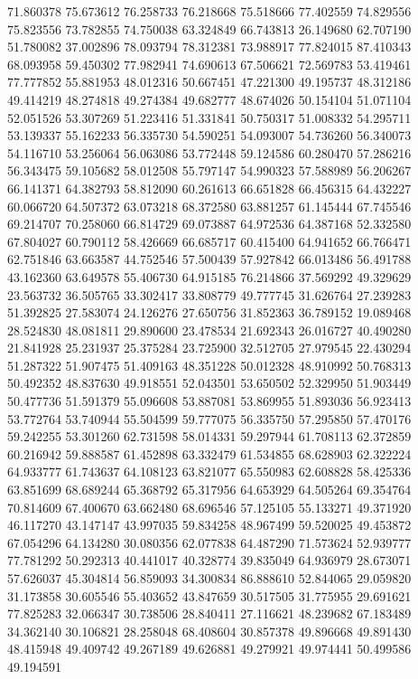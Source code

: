71.860378
75.673612
76.258733
76.218668
75.518666
77.402559
74.829556
75.823556
73.782855
74.750038
63.324849
66.743813
26.149680
62.707190
51.780082
37.002896
78.093794
78.312381
73.988917
77.824015
87.410343
68.093958
59.450302
77.982941
74.690613
67.506621
72.569783
53.419461
77.777852
55.881953
48.012316
50.667451
47.221300
49.195737
48.312186
49.414219
48.274818
49.274384
49.682777
48.674026
50.154104
51.071104
52.051526
53.307269
51.223416
51.331841
50.750317
51.008332
54.295711
53.139337
55.162233
56.335730
54.590251
54.093007
54.736260
56.340073
54.116710
53.256064
56.063086
53.772448
59.124586
60.280470
57.286216
56.343475
59.105682
58.012508
55.797147
54.990323
57.588989
56.206267
66.141371
64.382793
58.812090
60.261613
66.651828
66.456315
64.432227
60.066720
64.507372
63.073218
68.372580
63.881257
61.145444
67.745546
69.214707
70.258060
66.814729
69.073887
64.972536
64.387168
52.332580
67.804027
60.790112
58.426669
66.685717
60.415400
64.941652
66.766471
62.751846
63.663587
44.752546
57.500439
57.927842
66.013486
56.491788
43.162360
63.649578
55.406730
64.915185
76.214866
37.569292
49.329629
23.563732
36.505765
33.302417
33.808779
49.777745
31.626764
27.239283
51.392825
27.583074
24.126276
27.650756
31.852363
36.789152
19.089468
28.524830
48.081811
29.890600
23.478534
21.692343
26.016727
40.490280
21.841928
25.231937
25.375284
23.725900
32.512705
27.979545
22.430294
51.287322
51.907475
51.409163
48.351228
50.012328
48.910992
50.768313
50.492352
48.837630
49.918551
52.043501
53.650502
52.329950
51.903449
50.477736
51.591379
55.096608
53.887081
53.869955
51.893036
56.923413
53.772764
53.740944
55.504599
59.777075
56.335750
57.295850
57.470176
59.242255
53.301260
62.731598
58.014331
59.297944
61.708113
62.372859
60.216942
59.888587
61.452898
63.332479
61.534855
68.628903
62.322224
64.933777
61.743637
64.108123
63.821077
65.550983
62.608828
58.425336
63.851699
68.689244
65.368792
65.317956
64.653929
64.505264
69.354764
70.814609
67.400670
63.662480
68.696546
57.125105
55.133271
49.371920
46.117270
43.147147
43.997035
59.834258
48.967499
59.520025
49.453872
67.054296
64.134280
30.080356
62.077838
64.487290
71.573624
52.939777
77.781292
50.292313
40.441017
40.328774
39.835049
64.936979
28.673071
57.626037
45.304814
56.859093
34.300834
86.888610
52.844065
29.059820
31.173858
30.605546
55.403652
43.847659
30.517505
31.775955
29.691621
77.825283
32.066347
30.738506
28.840411
27.116621
48.239682
67.183489
34.362140
30.106821
28.258048
68.408604
30.857378
49.896668
49.891430
48.415948
49.409742
49.267189
49.626881
49.279921
49.974441
50.499586
49.194591
